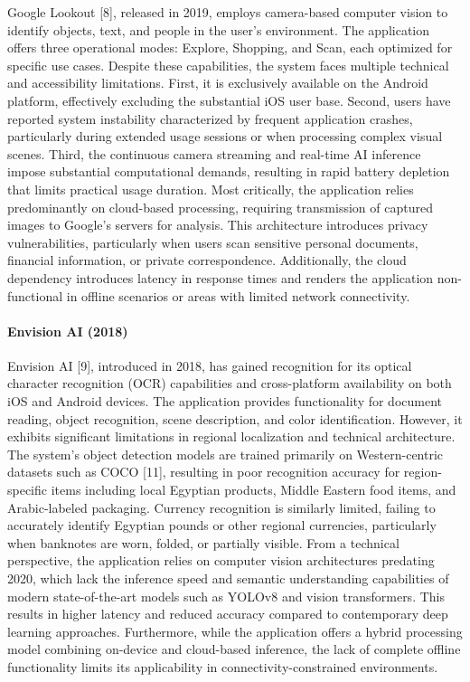 \documentclass[12pt,a4paper]{report}
\begin{document}
Google Lookout [8], released in 2019, employs camera-based computer vision to identify objects, text, and people in the user's environment. The application offers three operational modes: Explore, Shopping, and Scan, each optimized for specific use cases. Despite these capabilities, the system faces multiple technical and accessibility limitations. First, it is exclusively available on the Android platform, effectively excluding the substantial iOS user base. Second, users have reported system instability characterized by frequent application crashes, particularly during extended usage sessions or when processing complex visual scenes. Third, the continuous camera streaming and real-time AI inference impose substantial computational demands, resulting in rapid battery depletion that limits practical usage duration. Most critically, the application relies predominantly on cloud-based processing, requiring transmission of captured images to Google's servers for analysis. This architecture introduces privacy vulnerabilities, particularly when users scan sensitive personal documents, financial information, or private correspondence. Additionally, the cloud dependency introduces latency in response times and renders the application non-functional in offline scenarios or areas with limited network connectivity.

\paragraph*{Envision AI (2018)}

Envision AI [9], introduced in 2018, has gained recognition for its optical character recognition (OCR) capabilities and cross-platform availability on both iOS and Android devices. The application provides functionality for document reading, object recognition, scene description, and color identification. However, it exhibits significant limitations in regional localization and technical architecture. The system's object detection models are trained primarily on Western-centric datasets such as COCO [11], resulting in poor recognition accuracy for region-specific items including local Egyptian products, Middle Eastern food items, and Arabic-labeled packaging. Currency recognition is similarly limited, failing to accurately identify Egyptian pounds or other regional currencies, particularly when banknotes are worn, folded, or partially visible. From a technical perspective, the application relies on computer vision architectures predating 2020, which lack the inference speed and semantic understanding capabilities of modern state-of-the-art models such as YOLOv8 and vision transformers. This results in higher latency and reduced accuracy compared to contemporary deep learning approaches. Furthermore, while the application offers a hybrid processing model combining on-device and cloud-based inference, the lack of complete offline functionality limits its applicability in connectivity-constrained environments.
\end{document}
